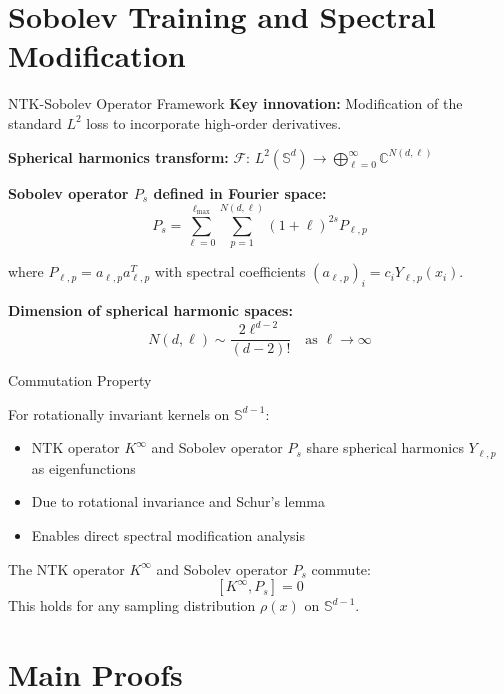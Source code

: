 \documentclass{beamer}
\begin{document}
\section{Sobolev Training and Spectral Modification}

\begin{frame}{NTK-Sobolev Operator Framework}
\textbf{Key innovation:} Modification of the standard $L^2$ loss to incorporate high-order derivatives.

\textbf{Spherical harmonics transform:} $\mathcal{F}$: $L^2(\mathbb{S}^d) \to \bigoplus_{\ell=0}^{\infty} \mathbb{C}^{N(d,\ell)}$

\textbf{Sobolev operator $P_s$ defined in Fourier space:}
\[ P_s = \sum_{\ell=0}^{\ell_{\max}} \sum_{p=1}^{N(d,\ell)} (1+\ell)^{2s}P_{\ell,p} \]

where $P_{\ell,p} = a_{\ell,p}a_{\ell,p}^T$ with spectral coefficients $(a_{\ell,p})_i = c_iY_{\ell,p}(x_i)$.

\textbf{Dimension of spherical harmonic spaces:}
\[ N(d,\ell) \sim \frac{2\ell^{d-2}}{(d-2)!} \quad \text{as } \ell \to \infty \]
\end{frame}

\begin{frame}{Commutation Property}
\begin{theorem}
For rotationally invariant kernels on $\mathbb{S}^{d-1}$:
\begin{itemize}
\item NTK operator $K^{\infty}$ and Sobolev operator $P_s$ share spherical harmonics $Y_{\ell,p}$ as eigenfunctions
\item Due to rotational invariance and Schur's lemma
\item Enables direct spectral modification analysis
\end{itemize}
\end{theorem}

\begin{theorem}
The NTK operator $K^{\infty}$ and Sobolev operator $P_s$ commute:
\[ [K^{\infty}, P_s] = 0 \]
This holds for any sampling distribution $\rho(x)$ on $\mathbb{S}^{d-1}$.
\end{theorem}
\end{frame}

\section{Main Proofs}
\end{document}
